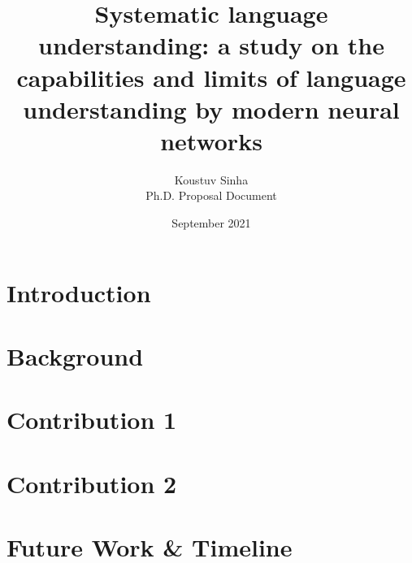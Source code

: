 \documentclass[12pt]{article}
\title{Systematic language understanding: a study on the capabilities and limits of language understanding by modern neural networks}
\author{Koustuv Sinha \\ Ph.D. Proposal Document}
\date{September 2021}
\begin{document}
\maketitle

\section{Introduction}





\section{Background}


\section{Contribution 1}


\section{Contribution 2}


\section{Future Work \& Timeline}
\end{document}
